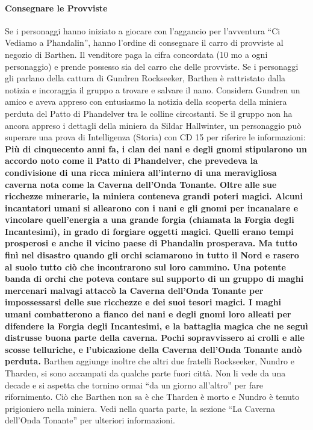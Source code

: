 \documentclass{article}
\begin{document}
\paragraph{Consegnare le Provviste}
Se i personaggi hanno iniziato
a giocare con l'aggancio per l'avventura “Ci Vediamo a
Phandalin”, hanno l’ordine di consegnare il carro di provviste
al negozio di Barthen. Il venditore paga la cifra concordata
(10 mo a ogni personaggio) e prende possesso sia del carro
che delle provviste. Se i personaggi gli parlano della cattura
di Gundren Rockseeker, Barthen è rattristato dalla notizia
e incoraggia il gruppo a trovare e salvare il nano. Considera
Gundren un amico e aveva appreso con entusiasmo la notizia
della scoperta della miniera perduta del Patto di Phandelver
tra le colline circostanti. Se il gruppo non ha ancora appreso
i dettagli della miniera da Sildar Hallwinter, un personaggio
può superare una prova di Intelligenza (Storia) con CD 15
per riferire le informazioni: \textbf{Più di cinquecento anni fa, i clan dei nani e degli gnomi
stipularono un accordo noto come il Patto di Phandelver, che
prevedeva la condivisione di una ricca miniera all’interno di
una meravigliosa caverna nota come la Caverna dell’Onda
Tonante. Oltre alle sue ricchezze minerarie, la miniera
conteneva grandi poteri magici. Alcuni incantatori umani si
allearono con i nani e gli gnomi per incanalare e vincolare
quell’energia a una grande forgia (chiamata la Forgia degli
Incantesimi), in grado di forgiare oggetti magici. Quelli
erano tempi prosperosi e anche il vicino paese di Phandalin
prosperava. Ma tutto finì nel disastro quando gli orchi
sciamarono in tutto il Nord e rasero al suolo tutto ciò che
incontrarono sul loro cammino.
Una potente banda di orchi che poteva contare sul supporto
di un gruppo di maghi mercenari malvagi attaccò la Caverna
dell’Onda Tonante per impossessarsi delle sue ricchezze e dei
suoi tesori magici. I maghi umani combatterono a fianco dei
nani e degli gnomi loro alleati per difendere la Forgia degli
Incantesimi, e la battaglia magica che ne seguì distrusse
buona parte della caverna. Pochi sopravvissero ai crolli e
alle scosse telluriche, e l'ubicazione della Caverna dell’Onda
Tonante andò perduta.}
Barthen aggiunge inoltre che altri due fratelli Rockseeker,
Nundro e Tharden, si sono accampati da qualche parte fuori
città. Non li vede da una decade e si aspetta che tornino ormai
“da un giorno all’altro” per fare rifornimento. Ciò che Barthen
non sa è che Tharden è morto e Nundro è tenuto prigioniero
nella miniera. Vedi nella quarta parte, la sezione “La Caverna
dell’Onda Tonante” per ulteriori informazioni.
\end{document}
